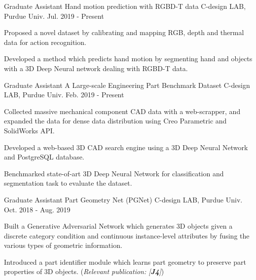 


\begin{cventries}
\cventry
{Graduate Assistant} %
{Hand motion prediction with RGBD-T data} %
{C-design LAB, Purdue Univ.} %
{Jul. 2019 - Present} %
{ %
\begin{cvitems}
\item {Proposed a novel dataset by calibrating and mapping RGB, depth and thermal data for action recognition.}
\item {Developed a method which predicts hand motion by segmenting hand and objects with a 3D Deep Neural network dealing with RGBD-T data.}
\end{cvitems}
}


\cventry
{Graduate Assistant} %
{A Large-scale Engineering Part Benchmark Dataset} %
{C-design LAB, Purdue Univ.} %
{Feb. 2019 - Present} %
{ %
\begin{cvitems}
\item {Collected massive mechanical component CAD data with a web-scrapper, and expanded the data for dense data distribution using Creo Parametric and SolidWorks API.}
\item {Developed a web-based 3D CAD search engine using a 3D Deep Neural Network and PostgreSQL database.}
\item {Benchmarked state-of-art 3D Deep Neural Network for classification and segmentation task to evaluate the dataset.}
\end{cvitems}
}


\cventry
{Graduate Assistant} %
{Part Geometry Net (PGNet)} %
{C-design LAB, Purdue Univ.} %
{Oct. 2018 - Aug. 2019} %
{ %
\begin{cvitems}
\item {Built a Generative Adversarial Network which generates 3D objects given a discrete category condition and continuous instance-level attributes by fusing the various types of geometric information.}
\item {Introduced a part identifier module which learns part geometry to preserve part properties of 3D objects. (\textit{Relevant publication: [\textbf{J4}]})}
\end{cvitems}
}


\end{cventries}
